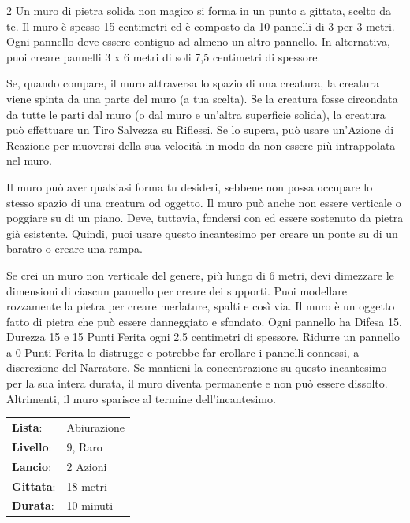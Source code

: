\begin{multicols}{2}
Un muro di pietra solida non magico si forma in un punto a gittata, scelto da te. Il muro è spesso 15 centimetri ed è composto da 10 pannelli di 3 per 3 metri. Ogni pannello deve essere contiguo ad almeno un altro pannello. In alternativa, puoi creare pannelli 3 x 6 metri di soli 7,5 centimetri di spessore.

Se, quando compare, il muro attraversa lo spazio di una creatura, la creatura viene spinta da una parte del muro (a tua scelta). Se la creatura fosse circondata da tutte le parti dal muro (o dal muro e un'altra superficie solida), la creatura può effettuare un Tiro Salvezza su Riflessi. Se lo supera, può usare un'Azione di Reazione per muoversi della sua velocità in modo da non essere più intrappolata nel muro.

Il muro può aver qualsiasi forma tu desideri, sebbene non possa occupare lo stesso spazio di una creatura od oggetto. Il muro può anche non essere verticale o poggiare su di un piano. Deve, tuttavia, fondersi con ed essere sostenuto da pietra già esistente. Quindi, puoi usare questo incantesimo per creare un ponte su di un baratro o creare una rampa.

Se crei un muro non verticale del genere, più lungo di 6 metri, devi dimezzare le dimensioni di ciascun pannello per creare dei supporti. Puoi modellare rozzamente la pietra per creare merlature, spalti e così via. Il muro è un oggetto fatto di pietra che può essere danneggiato e sfondato. Ogni pannello ha Difesa 15, Durezza 15 e 15 Punti Ferita ogni 2,5 centimetri di spessore. Ridurre un pannello a 0 Punti Ferita lo distrugge e potrebbe far crollare i pannelli connessi, a discrezione del Narratore. Se mantieni la concentrazione su questo incantesimo per la sua intera durata, il muro diventa permanente e non può essere dissolto. Altrimenti, il muro sparisce al termine dell'incantesimo.

\noindent\begin{tabularx}{\linewidth}{p{1.9cm}X}
	\rowcolor{gray!20}\textbf{Lista}: & Abiurazione \\
	\textbf{Livello}: & 9, Raro \\
	\rowcolor{gray!20}\textbf{Lancio}: & 2 Azioni \\
	\textbf{Gittata}: & 18 metri \\
	\rowcolor{gray!20}\textbf{Durata}: & 10 minuti \\
\end{tabularx}\smallskip


\end{multicols}
